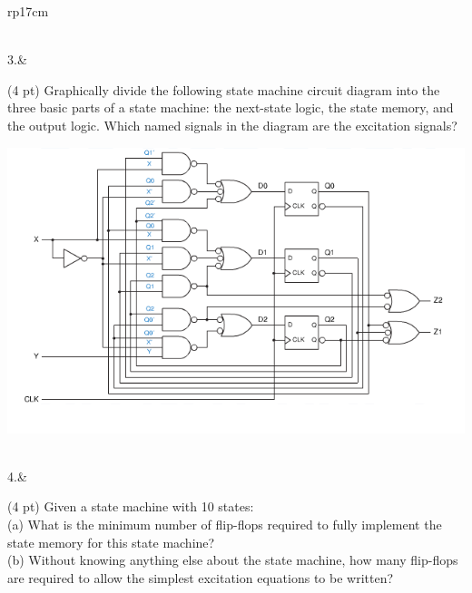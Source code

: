 \documentclass{article}
\begin{document}
\begin{longtable}[l]{rp{17cm}}
\begin{minipage}[t]{\linewidth}
\vspace{8cm
}
\end{minipage}\\
\medskip
3.&\begin{minipage}[t]{\linewidth}(4 pt) Graphically divide the following state machine circuit diagram into the three basic parts of a state machine: the next-state logic, the state memory, and the output logic.  Which named signals in the diagram are the excitation signals?
\begin{center}
  \includegraphics[scale=0.7]{../StateMachines/Assessments/Wakerly_7_43}
\end{center}

\vspace{8cm
}
\end{minipage}\\
\medskip
4.&\begin{minipage}[t]{\linewidth}(4 pt) Given a state machine with 10 states:\\
(a) What is the minimum number of flip-flops required to fully implement the state memory for this state machine?\\
(b) Without knowing anything else about the state machine, how many flip-flops are required to allow the simplest excitation equations to be written?\\ \\

\vspace{8cm
}
\end{minipage}\\
\medskip
\end{longtable}
\end{document}
